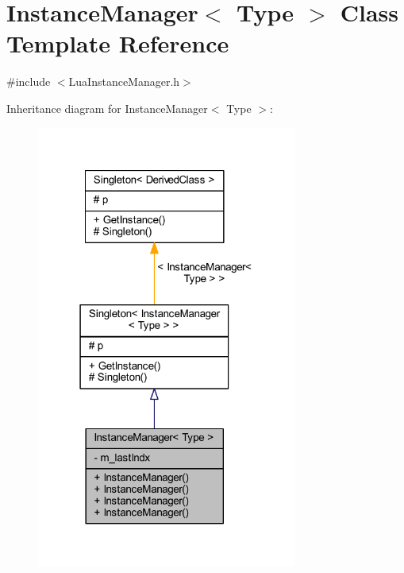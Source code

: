 \hypertarget{class_instance_manager}{}\section{Instance\+Manager$<$ Type $>$ Class Template Reference}
\label{class_instance_manager}


{\ttfamily \#include $<$Lua\+Instance\+Manager.\+h$>$}



Inheritance diagram for Instance\+Manager$<$ Type $>$\+:\nopagebreak
\begin{figure}[H]
\begin{center}
\leavevmode
\includegraphics[width=243pt]{class_instance_manager__inherit__graph}
\end{center}
\end{figure}


